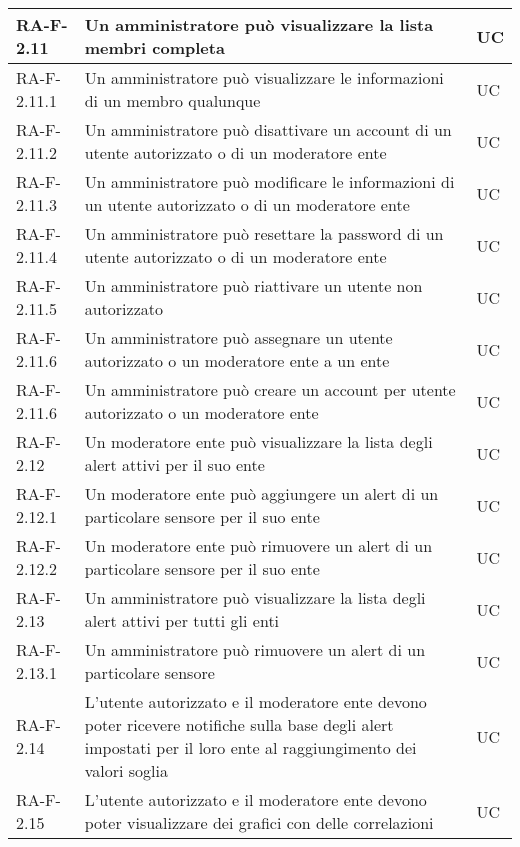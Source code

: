 \begin{center}
\begin{longtable}{|p{3cm}|p{9.85cm}|p{2cm}|}
		{\color{gray} RA-F-}2.11 & Un amministratore può visualizzare la lista membri completa & UC \\ \hline
		{\color{gray} RA-F-}2.11.1 & Un amministratore può visualizzare le informazioni di un membro qualunque & UC \\ \hline
		{\color{gray} RA-F-}2.11.2 & Un amministratore può disattivare un account di un utente autorizzato o di un moderatore ente & UC \\ \hline
		{\color{gray} RA-F-}2.11.3 & Un amministratore può modificare le informazioni di un utente autorizzato o di un moderatore ente & UC \\ \hline
		{\color{gray} RA-F-}2.11.4 & Un amministratore può resettare la password di un utente autorizzato o di un moderatore ente & UC \\ \hline
		{\color{gray} RA-F-}2.11.5 & Un amministratore può riattivare un utente non autorizzato & UC \\ \hline
		{\color{gray} RA-F-}2.11.6 & Un amministratore può assegnare un utente autorizzato o un moderatore ente a un ente & UC \\ \hline
		{\color{gray} RA-F-}2.11.6 & Un amministratore può creare un account per utente autorizzato o un moderatore ente & UC \\ \hline

		{\color{gray} RA-F-}2.12 & Un moderatore ente può visualizzare la lista degli alert attivi per il suo ente & UC \\ \hline
		{\color{gray} RA-F-}2.12.1 & Un moderatore ente può aggiungere un alert di un particolare sensore per il suo ente & UC \\ \hline
		{\color{gray} RA-F-}2.12.2 & Un moderatore ente può rimuovere un alert di un particolare sensore per il suo ente & UC \\ \hline
		{\color{gray} RA-F-}2.13 & Un amministratore può visualizzare la lista degli alert attivi per tutti gli enti & UC \\ \hline
		{\color{gray} RA-F-}2.13.1 & Un amministratore può rimuovere un alert di un particolare sensore & UC \\ \hline
		{\color{gray} RA-F-}2.14 & L'utente autorizzato e il moderatore ente devono poter ricevere notifiche sulla base degli alert impostati per il loro ente al raggiungimento dei valori soglia & UC \\ \hline
		{\color{gray} RA-F-}2.15 & L'utente autorizzato e il moderatore ente devono poter visualizzare dei grafici con delle correlazioni & UC \\ \hline



\end{longtable}
\end{center}
